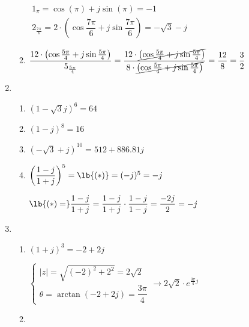 \begin{enumerate}[label=\color{red}\textbf{\arabic*)}]
\begin{enumerate}[label=\color{red}\textbf{\textbf{\textbf{\alph*)}}}]
                $\begin{array}{l}
                    1_{\pi}=\cos(\pi)+j\sin(\pi)=-1\\
                    2_{\frac{7\pi}{6} }=2\cdot \left( \cos \dfrac{7\pi}{6}+j\sin \dfrac{7\pi}{6} \right) = -\sqrt{3} - j
                \end{array}$
            \item {}

                $\dfrac{12\cdot \left( \cos\frac{5\pi}{4} +j\sin \frac{5\pi}{4}   \right) }{5_{\frac{5\pi}{4} }}=\dfrac{12\cdot \cancel{ \left( \cos\frac{5\pi}{4}+j\sin \frac{5\pi}{4}   \right) }}{8\cdot \cancel{\left( \cos\frac{5\pi}{4} +j\sin \frac{5\pi}{4}  \right) } }=\dfrac{12}{8}=\dfrac{3}{2}$
        \end{enumerate}
    \item {}
        \begin{enumerate}[label=\color{red}\textbf{\textbf{\textbf{\alph*)}}}]
            \item {}

                $(1-\sqrt{3} j)^6=64$
            \item {} 

                $(1-j)^8=16$
            \item {} 

                $(-\sqrt{3}+j)^{10}=512+886.81j $
            \item {} 

                $\left( \dfrac{1-j}{1+j} \right)^5=\lb{(\ast)}= (-j)^5=-j $ 

                $\lb{(\ast)=}\dfrac{1-j}{1+j}=\dfrac{1-j}{1+j}\cdot \dfrac{1-j}{1-j}=\dfrac{-2j}{2}=-j $
        \end{enumerate}
    \item {}
        \begin{enumerate}[label=\color{red}\textbf{\textbf{\textbf{\alph*)}}}]
            \item {}

                $(1+j)^3=-2+2j$

                $\begin{cases}
                    |z|=\sqrt{(-2)^2+2^2}=2\sqrt{2}  \\
                    \theta=\arctan\left( -2+2j \right) = \dfrac{3\pi}{4}
                \end{cases}\longrightarrow 2\sqrt{2}\cdot e^{\frac{3\pi}{4}j}  $
            \item {} 


\end{enumerate}
\end{enumerate}

